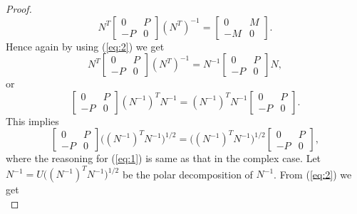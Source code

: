 \documentclass[12pt,a4paper,twoside]{article}
\numberwithin{equation}{section}
\theoremstyle{definition}  %
\theoremstyle{plain}  %
\theoremstyle{remark} %
\begin{document}
\begin{proof}
 \begin{equation*}
     N^{T}\begin{bmatrix}
              0 &  P   \\
               - P & 0
             \end{bmatrix} (N^{T})^{-1}
    = \begin{bmatrix}
              0 & M  \\
              -M & 0
             \end{bmatrix}.
 \end{equation*}
Hence again by using (\ref{eq:2}) we get
\begin{equation*}
  N^{T}\begin{bmatrix}
              0 &  P   \\
               - P & 0
             \end{bmatrix} (N^{T})^{-1}
  =  N^{-1}\begin{bmatrix}
              0 &  P   \\
               - P & 0
             \end{bmatrix} N,
\end{equation*}
  or
\begin{equation*}
  \begin{bmatrix}
              0 &  P   \\
               - P & 0
             \end{bmatrix} (N^{-1})^{T}N^{-1}
  =  (N^{-1})^{T}N^{-1}\begin{bmatrix}
              0 &  P   \\
               - P & 0
             \end{bmatrix}.
\end{equation*}
This implies
\begin{equation}\label{eq:1}
   \begin{bmatrix}
              0 &  P   \\
               - P & 0
             \end{bmatrix} \big((N^{-1})^{T}N^{-1}\big)^{1/2}
  = \big( (N^{-1})^{T}N^{-1}\big)^{1/2} \begin{bmatrix}
              0 &  P   \\
               - P & 0
             \end{bmatrix},
\end{equation}
where the reasoning for (\ref{eq:1}) is same as that in the complex case. Let $N^{-1} = U\big( (N^{-1})^{T}N^{-1}\big)^{1/2}$ be the polar decomposition of $N^{-1}$. From (\ref{eq:2}) we get
\begin{equation*}

\end{equation*}
\end{proof}
\end{document}
